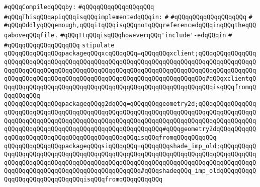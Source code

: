 \newline
\verb|#qQQqCompiledqQQqby:|\newline
\verb|#qQQqqQQqqQQqqQQqqQQq|\newline
\newline
\verb|#qQQqThisqQQqapiqQQqisqQQqimplementedqQQqin:|\newline
\verb|#|\newline
\verb|#qQQqqQQqqQQqqQQqqQQq|\newline
\verb|#|\newline
\verb|#qQQqOddlyqQQqenough,qQQqitqQQqisqQQqnotqQQqreferencedqQQqinqQQqtheqQQqaboveqQQqfile.|\newline
\verb|#qQQqItqQQqisqQQqhoweverqQQq'include'-edqQQqin|\newline
\verb|#|\newline
\verb|#qQQqqQQqqQQqqQQqqQQq|\newline
\newline
\verb|stipulate|\newline
\verb|qQQqqQQqqQQqqQQqpackageqQQqxcqQQqqQQq=qQQqqQQqxclient;qQQqqQQqqQQqqQQqqQQqqQQqqQQqqQQqqQQqqQQqqQQqqQQqqQQqqQQqqQQqqQQqqQQqqQQqqQQqqQQqqQQqqQQqqQQqqQQqqQQqqQQqqQQqqQQqqQQqqQQqqQQqqQQqqQQqqQQqqQQqqQQqqQQqqQQqqQQqqQQqqQQqqQQqqQQqqQQqqQQqqQQqqQQqqQQqqQQqqQQqqQQqqQQqqQQq#qQQqxclientqQQqqQQqqQQqqQQqqQQqqQQqqQQqqQQqqQQqqQQqqQQqqQQqqQQqqQQqqQQqisqQQqfromqQQqqQQqqQQq|\newline
\verb|qQQqqQQqqQQqqQQqpackageqQQqg2dqQQq=qQQqqQQqgeometry2d;qQQqqQQqqQQqqQQqqQQqqQQqqQQqqQQqqQQqqQQqqQQqqQQqqQQqqQQqqQQqqQQqqQQqqQQqqQQqqQQqqQQqqQQqqQQqqQQqqQQqqQQqqQQqqQQqqQQqqQQqqQQqqQQqqQQqqQQqqQQqqQQqqQQqqQQqqQQqqQQqqQQqqQQqqQQqqQQqqQQqqQQqqQQqqQQqqQQqqQQq#qQQqgeometry2dqQQqqQQqqQQqqQQqqQQqqQQqqQQqqQQqqQQqqQQqqQQqqQQqisqQQqfromqQQqqQQqqQQq|\newline
\verb|qQQqqQQqqQQqqQQqpackageqQQqsiqQQqqQQq=qQQqqQQqshade_imp_old;qQQqqQQqqQQqqQQqqQQqqQQqqQQqqQQqqQQqqQQqqQQqqQQqqQQqqQQqqQQqqQQqqQQqqQQqqQQqqQQqqQQqqQQqqQQqqQQqqQQqqQQqqQQqqQQqqQQqqQQqqQQqqQQqqQQqqQQqqQQqqQQqqQQqqQQqqQQqqQQqqQQqqQQqqQQqqQQqqQQqqQQqqQQq#qQQqshadeqQQq_imp_oldqQQqqQQqqQQqqQQqqQQqqQQqqQQqqQQqisqQQqfromqQQqqQQqqQQq|\newline
